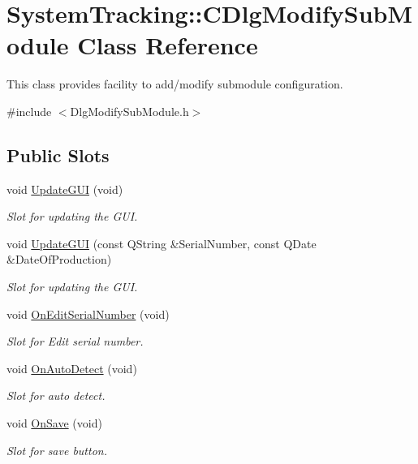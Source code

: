 \hypertarget{classSystemTracking_1_1CDlgModifySubModule}{\section{\-System\-Tracking\-:\-:\-C\-Dlg\-Modify\-Sub\-Module \-Class \-Reference}
\label{classSystemTracking_1_1CDlgModifySubModule}
}


\-This class provides facility to add/modify submodule configuration.  




{\ttfamily \#include $<$\-Dlg\-Modify\-Sub\-Module.\-h$>$}

\subsection*{\-Public \-Slots}
\begin{DoxyCompactItemize}
\item 
void \hyperlink{classSystemTracking_1_1CDlgModifySubModule_aac9534f5a406329216931cd1aa8273ac}{\-Update\-G\-U\-I} (void)
\begin{DoxyCompactList}\small\item\em \-Slot for updating the \-G\-U\-I. \end{DoxyCompactList}\item 
void \hyperlink{classSystemTracking_1_1CDlgModifySubModule_a844d6b9b71c8966628f34d0693e3ca86}{\-Update\-G\-U\-I} (const \-Q\-String \&\-Serial\-Number, const \-Q\-Date \&\-Date\-Of\-Production)
\begin{DoxyCompactList}\small\item\em \-Slot for updating the \-G\-U\-I. \end{DoxyCompactList}\item 
void \hyperlink{classSystemTracking_1_1CDlgModifySubModule_a7a371eda24b8432b9cdf309170657218}{\-On\-Edit\-Serial\-Number} (void)
\begin{DoxyCompactList}\small\item\em \-Slot for \-Edit serial number. \end{DoxyCompactList}\item 
void \hyperlink{classSystemTracking_1_1CDlgModifySubModule_a1202533909b8edd1834ba0f4c1759159}{\-On\-Auto\-Detect} (void)
\begin{DoxyCompactList}\small\item\em \-Slot for auto detect. \end{DoxyCompactList}\item 
void \hyperlink{classSystemTracking_1_1CDlgModifySubModule_a19f0afd71a94f3c12a7599c86d24ce34}{\-On\-Save} (void)
\begin{DoxyCompactList}\small\item\em \-Slot for save button. \end{DoxyCompactList}\end{DoxyCompactItemize}
